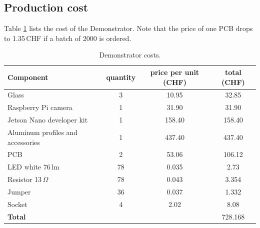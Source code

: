 \subsection{Production cost}
Table \ref{development:cost} lists the cost of the Demonstrator.
Note that the price of one PCB drops to 1.35\,CHF if a batch of 2000 is ordered.
\begin{table}[ht]
	\centering
	\begin{tabular}{|l|c|c|c|}
		\hline
		Component & quantity & price per unit (CHF)& total (CHF)\\
		\hline
		Glass & 3 & 10.95 & 32.85\\
		\hline
		Raspberry Pi camera&1&31.90&31.90\\
		\hline
		Jetson Nano developer kit&1&158.40&158.40\\
		\hline	
		Aluminum profiles and accessories&1&437.40&437.40\\
		\hline
		PCB&2&53.06&106.12\\
		\hline
		LED white 76\,lm&78&0.035&2.73\\
		\hline
		Resistor 13\,$\Omega$&78&0.043&3.354\\
		\hline
		Jumper&36&0.037&1.332\\
		\hline
		Socket&4&2.02&8.08\\
		\hline
		\hline
		\textbf{Total}&&&728.168\\
		\hline
	\end{tabular}
	\caption{Demonstrator costs.\label{development:cost}}
\end{table}